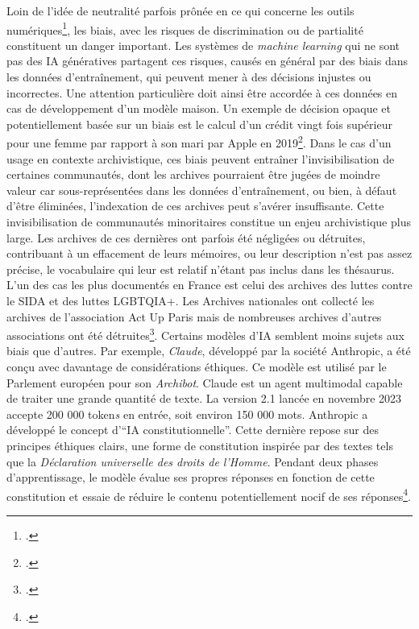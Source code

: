 	Loin de l'idée de neutralité parfois prônée en ce qui concerne les
	outils numériques\footcite{girard-chanudet_travail_2023}, les biais, avec les risques de
	discrimination ou de partialité constituent un danger important. Les
	systèmes de \emph{machine learning} qui ne sont pas des IA génératives
	partagent ces risques, causés en général par des biais dans les données
	d'entraînement, qui peuvent mener à des décisions injustes ou
	incorrectes. Une attention particulière doit ainsi être accordée à ces
	données en cas de développement d'un modèle maison. Un exemple de
	décision opaque et potentiellement basée sur un biais est le calcul d'un
	crédit vingt fois supérieur pour une femme par rapport à son mari par
	Apple en 2019\footcite{vigdor_apple_2019}.
	Dans le cas d'un usage en contexte archivistique, ces biais peuvent
	entraîner l'invisibilisation de certaines communautés, dont les archives
	pourraient être jugées de moindre valeur car sous-représentées dans les
	données d'entraînement, ou bien, à défaut d'être éliminées, l'indexation
	de ces archives peut s'avérer insuffisante. Cette invisibilisation de
	communautés minoritaires constitue un enjeu archivistique plus large.
	Les archives de ces dernières ont parfois été négligées ou détruites,
	contribuant à un effacement de leurs mémoires, ou leur description n'est pas assez précise,
	le vocabulaire qui leur est relatif n'étant pas inclus dans les thésaurus.
	L'un des cas les plus documentés en France est celui des archives des luttes contre le SIDA
	et des luttes LGBTQIA+. Les Archives nationales ont collecté les archives de l'association
	Act Up Paris mais de nombreuses archives d'autres associations ont été détruites\footcite{comoy_archives_2019}.
	Certains modèles d'IA semblent moins sujets aux biais que
	d'autres. Par exemple, \emph{Claude}, développé par la société
	Anthropic, a été conçu avec davantage de considérations
	éthiques.
	Ce modèle est utilisé par le Parlement européen pour son
	\emph{Archibot}. Claude est un agent \gls{multimodal} capable de traiter
	une grande quantité de texte. La version 2.1 lancée en novembre 2023
	accepte 200 000 \gls{token}\emph{s} en entrée, soit environ 150 000 mots.
	Anthropic a développé le concept d'\enquote{IA constitutionnelle}. 
	Cette dernière repose sur des principes éthiques clairs, une forme de constitution inspirée par
	des textes tels que la \emph{Déclaration universelle des droits de l'Homme}.
	Pendant deux phases d'apprentissage, le modèle évalue ses propres réponses en fonction de cette constitution et
	essaie de réduire le contenu potentiellement nocif de ses réponses\footcite{bai_constitutional_2022}.
